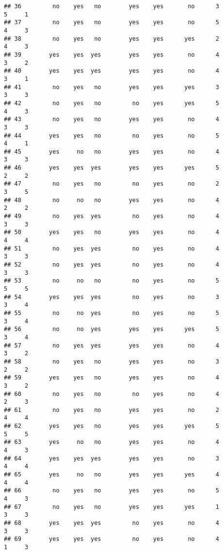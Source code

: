 \documentclass[]{article}
\begin{document}
\begin{verbatim}
## 36         no    yes   no        yes    yes       no      3        5     1
## 37         no    yes   no        yes    yes       no      5        4     3
## 38         no    yes   no        yes    yes      yes      2        4     3
## 39        yes    yes  yes        yes    yes       no      4        3     2
## 40        yes    yes  yes        yes    yes       no      4        3     1
## 41         no    yes   no        yes    yes      yes      3        3     3
## 42         no    yes   no         no    yes      yes      5        4     3
## 43         no    yes   no        yes    yes       no      4        3     3
## 44        yes    yes   no         no    yes       no      5        4     1
## 45        yes     no   no        yes    yes       no      4        3     3
## 46        yes    yes  yes        yes    yes      yes      5        2     2
## 47         no    yes   no         no    yes       no      2        3     5
## 48         no     no   no        yes    yes       no      4        2     2
## 49         no    yes  yes         no    yes       no      4        3     3
## 50        yes    yes   no        yes    yes       no      4        4     4
## 51         no    yes  yes         no    yes       no      4        3     3
## 52         no    yes  yes         no    yes       no      4        3     3
## 53         no     no   no         no    yes       no      5        5     5
## 54        yes    yes  yes         no    yes       no      3        3     4
## 55         no     no  yes         no    yes       no      5        3     4
## 56         no     no  yes        yes    yes      yes      5        3     4
## 57         no    yes  yes        yes    yes       no      4        3     2
## 58         no    yes   no        yes    yes       no      3        2     2
## 59        yes    yes   no        yes    yes       no      4        3     2
## 60         no    yes   no         no    yes       no      4        2     3
## 61         no    yes   no        yes    yes       no      2        4     4
## 62        yes    yes   no        yes    yes      yes      5        5     5
## 63        yes     no   no        yes    yes       no      4        4     3
## 64        yes    yes  yes        yes    yes       no      3        4     4
## 65        yes     no   no        yes    yes      yes      4        4     4
## 66         no    yes   no        yes    yes       no      5        4     3
## 67         no    yes   no        yes    yes      yes      1        3     3
## 68        yes    yes  yes         no    yes       no      4        3     3
## 69        yes    yes  yes         no    yes       no      4        1     3

\end{verbatim}
\end{document}
